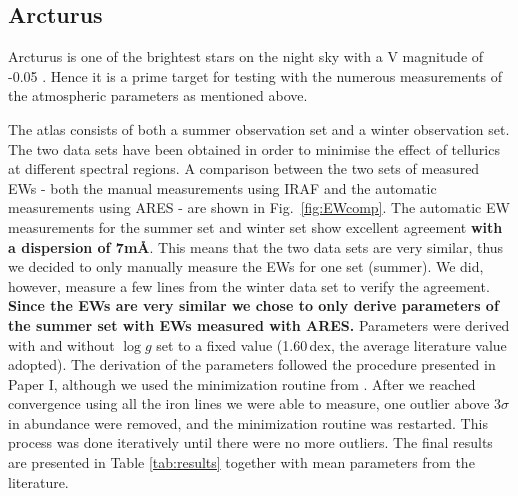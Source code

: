 \documentclass{aa}
\begin{document}
\subsection{Arcturus}
\label{sec:arcturus}

Arcturus is one of the brightest stars on the night sky with a V magnitude of
-0.05 \citep{Ducati2002}. Hence it is a prime target for testing with the
numerous measurements of the atmospheric parameters as mentioned above.

The atlas consists of both a summer observation set and a winter observation
set. The two data sets have been obtained in order to minimise the effect of
tellurics at different spectral regions. A comparison between the two sets of
measured EWs - both the manual measurements using IRAF and the automatic
measurements using ARES - are shown in Fig.~\ref{fig:EWcomp}. The automatic EW
measurements for the summer set and winter set show excellent agreement {\bf
with a dispersion of 7m\AA{}}. This means that the two data sets are very
similar, thus we decided to only manually measure the EWs for one set (summer).
We did, however, measure a few lines from the winter data set to verify the
agreement. {\bf Since the EWs are very similar we chose to only derive
parameters of the summer set with EWs measured with ARES.} Parameters were
derived with and without $\log g$ set to a fixed value (1.60\,dex, the average
literature value adopted). The derivation of the parameters followed the
procedure presented in Paper I, although we used the minimization routine from
\citet{Andreasen2017a}. After we reached convergence using all the iron lines we
were able to measure, one outlier above $3\sigma$ in abundance were removed, and
the minimization routine was restarted. This process was done iteratively until
there were no more outliers. The final results are presented in Table
\ref{tab:results} together with mean parameters from the literature.
\end{document}
